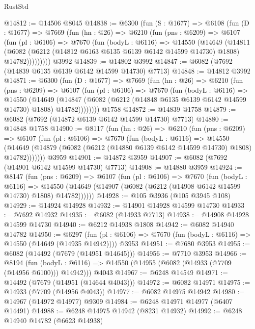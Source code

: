 \begin{lexlean}{RustStd}
\begin{coremodule}
@14812 := @14506 @8045
@14838 := @6300
    (fun (S : @1677) =>
    @6108
      (fun (D : @1677) =>
      @7669
        (fun (hn : @26) =>
        @6210
          (fun (pns : @6209) =>
          @6107
            (fun (pl : @6106) =>
            @7670
              (fun (bodyL : @6116) =>
              @14550
                (@14649
                  (@14811
                    (@6082
                      (@6212 (@14812 @6163 @6135 @6139 @6142 @14599 @14730) @1808)
                      @14782)))))))))
    @3992
@14839 := @14802 @3992
@14847 := @6082 (@7692 (@14839 @6135 @6139 @6142 @14599 @14730) @7713)
@14848 := @14812 @3992
@14871 := @6300
    (fun (D : @1677) =>
    @7669
      (fun (hn : @26) =>
      @6210
        (fun (pns : @6209) =>
        @6107
          (fun (pl : @6106) =>
          @7670
            (fun (bodyL : @6116) =>
            @14550
              (@14649
                (@14847 (@6082 (@6212 (@14848 @6135 @6139 @6142 @14599 @14730) @1808) @14782))))))))
    @1758
@14872 := @14839 @1758
@14879 := @6082 (@7692 (@14872 @6139 @6142 @14599 @14730) @7713)
@14880 := @14848 @1758
@14900 := @8117
    (fun (hn : @26) =>
    @6210
      (fun (pns : @6209) =>
      @6107
        (fun (pl : @6106) =>
        @7670
          (fun (bodyL : @6116) =>
          @14550
            (@14649 (@14879 (@6082 (@6212 (@14880 @6139 @6142 @14599 @14730) @1808) @14782)))))))
    @3959
@14901 := @14872 @3959
@14907 := @6082 (@7692 (@14901 @6142 @14599 @14730) @7713)
@14908 := @14880 @3959
@14924 := @8147
    (fun (pns : @6209) =>
    @6107
      (fun (pl : @6106) =>
      @7670
        (fun (bodyL : @6116) =>
        @14550 (@14649 (@14907 (@6082 (@6212 (@14908 @6142 @14599 @14730) @1808) @14782))))))
@14928 := @105 @3936 (@105 @3945 @108)
@14929 := @14924 @14928
@14932 := @14901 @14928 @14599 @14730
@14933 := @7692 @14932
@14935 := @6082 (@14933 @7713)
@14938 := @14908 @14928 @14599 @14730
@14940 := @6212 @14938 @1808
@14942 := @6082 @14940 @14782
@14950 := @6297
    (fun (pl : @6106) => @7670 (fun (bodyL : @6116) => @14550 (@14649 (@14935 @14942))))
    @3953
@14951 := @7680 @3953
@14955 := @6082 (@14492 (@7679 (@14951 @14645)))
@14956 := @7710 @3953
@14966 := @8194
    (fun (bodyL : @6116) => @14550 (@14955 (@6082 (@14933 (@7709 (@14956 @6100))) @14942)))
    @4043
@14967 := @6248 @14549
@14971 := @14492 (@7679 (@14951 (@14644 @4043)))
@14972 := @6082 @14971
@14975 := @14933 (@7709 (@14956 @4043))
@14977 := @6082 @14975 @14942
@14980 := @14967 (@14972 @14977) @9309
@14984 := @6248 @14971 @14977 (@6407 @14491)
@14988 := @6248 @14975 @14942 (@8231 @14932)
@14992 := @6248 @14940 @14782 (@6623 @14938)

\end{coremodule}
\end{lexlean}
